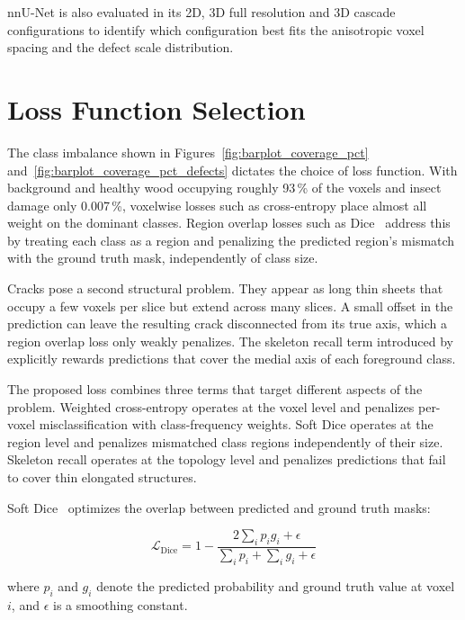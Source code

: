 nnU-Net is also evaluated in its 2D, 3D full resolution and 3D cascade configurations to identify which configuration best fits the anisotropic voxel spacing and the defect scale distribution.

\section{Loss Function Selection}

The class imbalance shown in Figures~\ref{fig:barplot_coverage_pct} and~\ref{fig:barplot_coverage_pct_defects} dictates the choice of loss function. With background and healthy wood occupying roughly 93\,\% of the voxels and insect damage only 0.007\,\%, voxelwise losses such as cross-entropy place almost all weight on the dominant classes. Region overlap losses such as Dice~\cite{milletari2016vnet} address this by treating each class as a region and penalizing the predicted region's mismatch with the ground truth mask, independently of class size.

Cracks pose a second structural problem. They appear as long thin sheets that occupy a few voxels per slice but extend across many slices. A small offset in the prediction can leave the resulting crack disconnected from its true axis, which a region overlap loss only weakly penalizes. The skeleton recall term introduced by~\cite{kirchhoff2024skeletonrecall} explicitly rewards predictions that cover the medial axis of each foreground class.

The proposed loss combines three terms that target different aspects of the problem. Weighted cross-entropy operates at the voxel level and penalizes per-voxel misclassification with class-frequency weights. Soft Dice operates at the region level and penalizes mismatched class regions independently of their size. Skeleton recall operates at the topology level and penalizes predictions that fail to cover thin elongated structures.

Soft Dice~\cite{milletari2016vnet} optimizes the overlap between predicted and ground truth masks:

\begin{equation}
\mathcal{L}_{\text{Dice}} = 1 - \frac{2 \sum_i p_i g_i + \epsilon}{\sum_i p_i + \sum_i g_i + \epsilon}
\label{eq:dice}
\end{equation}

where $p_i$ and $g_i$ denote the predicted probability and ground truth value at voxel $i$, and $\epsilon$ is a smoothing constant.

